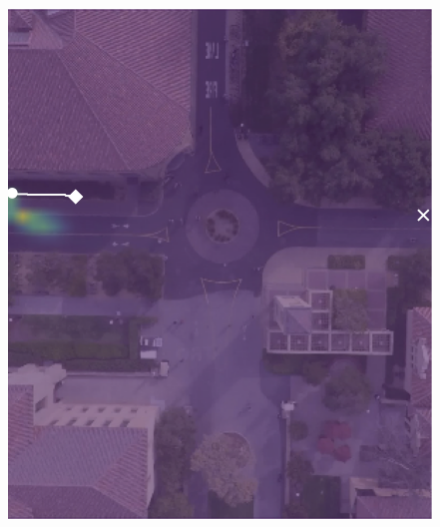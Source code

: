 \documentclass[letterpaper,10pt,conference]{ieeeconf}
\begin{document}
\begin{figure}
\vspace{0.5cm}	
\begin{minipage}[t]{0.5cm}
\end{minipage}
\begin{minipage}[t]{0.3\linewidth}
	\includegraphics[width=\linewidth]{./figures/comparison/kit_death_1_2_t=70.png}
\end{minipage}
\begin{minipage}[t]{0.3\linewidth}

\end{minipage}
\end{figure}
\end{document}
